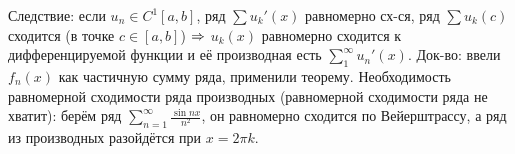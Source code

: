 Следствие: если $u_n \in C^1[a, b]$, ряд $\sum u_k'(x)$ равномерно сх-ся, ряд $\sum u_k(c)$ сходится (в точке $c\in[a,b]$) $\Rightarrow$ $u_k(x)$ равномерно сходится к дифференцируемой функции
и её производная есть $\sum_1^\infty u_n'(x)$.
Док-во: ввели $f_n(x)$ как частичную сумму ряда, применили теорему.
Необходимость равномерной сходимости ряда производных (равномерной сходимости ряда не хватит): берём ряд $\sum_{n=1}^\infty \frac{\sin nx}{n^2}$, он равномерно сходится по Вейерштрассу,
а ряд из производных разойдётся при $x=2\pi k$.
